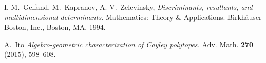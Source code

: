 \documentclass[11pt]{amsart}
\theoremstyle{plain}
\theoremstyle{definition}
\theoremstyle{remark}
\numberwithin{equation}{section}
\begin{document}
\begin{thebibliography}{100}
 I. M.~Gelfand,  M.~Kapranov,  A. V.~Zelevinsky,   \emph{Discriminants, resultants, and multidimensional determinants.}
Mathematics: Theory \& Applications. Birkhäuser Boston, Inc., Boston, MA,  1994.

 A.~Ito \emph{
Algebro-geometric characterization of Cayley polytopes.}
 Adv. Math.  {\bf 270}  (2015), 598--608.



		


\end{thebibliography}
\end{document}
